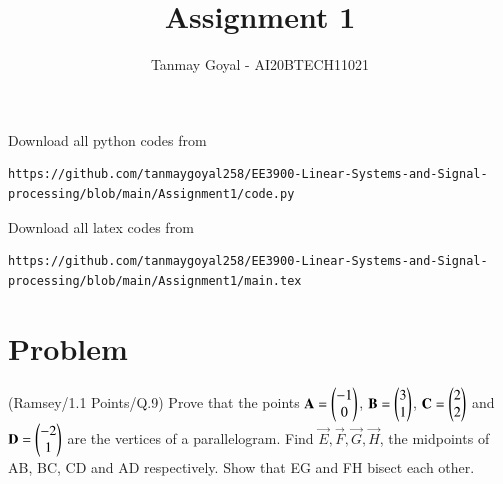 \documentclass[journal,12pt,twocolumn]{IEEEtran}
\begin{document}
     \def\topbox#1{\raisebox{-\baselineskip}[0in][0in]{#1}}
     \def\midbox#1{\raisebox{-0.5\baselineskip}[0in][0in]{#1}}
\vspace{3cm}
\title{Assignment 1}
\author{Tanmay Goyal - AI20BTECH11021}
\maketitle
\newpage
\bigskip
\renewcommand{\thefigure}{\theenumi}
\renewcommand{\thetable}{\theenumi}
Download all python codes from 
\begin{lstlisting}
https://github.com/tanmaygoyal258/EE3900-Linear-Systems-and-Signal-processing/blob/main/Assignment1/code.py
\end{lstlisting}
Download all latex codes from 
\begin{lstlisting}
https://github.com/tanmaygoyal258/EE3900-Linear-Systems-and-Signal-processing/blob/main/Assignment1/main.tex
\end{lstlisting}
\section{Problem}
(Ramsey/1.1 Points/Q.9) Prove that the points 
$\mathbf{A} = \begin{pmatrix}-1\\0\end{pmatrix}$,
$\mathbf{B} = \begin{pmatrix}3\\1\end{pmatrix}$,
$\mathbf{C} = \begin{pmatrix}2\\2\end{pmatrix}$ and 
$\mathbf{D} = \begin{pmatrix}-2\\1\end{pmatrix}$
are the vertices of a parallelogram. Find $\vec{E} , \vec{F} , \vec{G} , \vec{H}$, the midpoints of AB, BC, CD and AD respectively. Show that EG and FH bisect each other.
\end{document}
